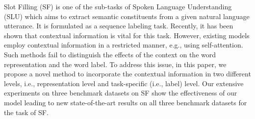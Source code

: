 Slot Filling (SF) is one of the sub-tasks of Spoken Language Understanding (SLU) which aims to extract semantic constituents from a given natural language utterance. It is formulated as a sequence labeling task. Recently, it has been shown that contextual information is vital for this task. However, existing models employ contextual information in a restricted manner, e.g., using self-attention. Such methods fail to distinguish the effects of the context on the word representation and the word label. To address this issue, in this paper, we propose a novel method to incorporate the contextual information in two different levels, i.e., representation level and task-specific (i.e., label) level. Our extensive experiments on three benchmark datasets on SF show the effectiveness of our model leading to new state-of-the-art results on all three benchmark datasets for the task of SF.
